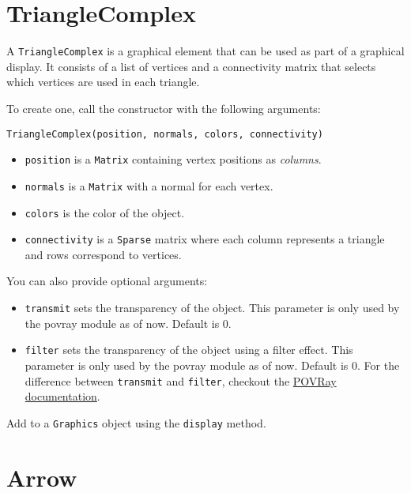 \hypertarget{trianglecomplex}{%
\section{TriangleComplex}\label{trianglecomplex}}

A \texttt{TriangleComplex} is a graphical element that can be used as
part of a graphical display. It consists of a list of vertices and a
connectivity matrix that selects which vertices are used in each
triangle.

To create one, call the constructor with the following arguments:

\begin{lstlisting}
TriangleComplex(position, normals, colors, connectivity)
\end{lstlisting}

\begin{itemize}

\item
  \texttt{position} is a \texttt{Matrix} containing vertex positions as
  \emph{columns}.
\item
  \texttt{normals} is a \texttt{Matrix} with a normal for each vertex.
\item
  \texttt{colors} is the color of the object.
\item
  \texttt{connectivity} is a \texttt{Sparse} matrix where each column
  represents a triangle and rows correspond to vertices.
\end{itemize}

You can also provide optional arguments:

\begin{itemize}

\item
  \texttt{transmit} sets the transparency of the object. This parameter
  is only used by the povray module as of now. Default is 0.
\item
  \texttt{filter} sets the transparency of the object using a filter
  effect. This parameter is only used by the povray module as of now.
  Default is 0. For the difference between \texttt{transmit} and
  \texttt{filter}, checkout the
  \href{http://xahlee.info/3d/povray-glassy.html}{POVRay documentation}.
\end{itemize}

Add to a \texttt{Graphics} object using the \texttt{display} method.

\hypertarget{arrow}{%
\section{Arrow}\label{arrow}}

